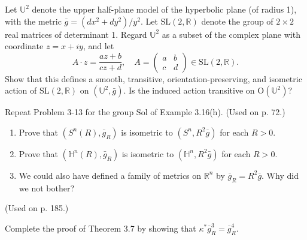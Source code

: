\begin{exercise}\label{prob:sl2r-upper-half-plane}
Let $\mathbb{U}^2$ denote the upper half-plane model of the hyperbolic plane (of radius 1), with the metric $\bar{g} = (dx^2 + dy^2)/y^2$. Let $\text{SL}(2,\mathbb{R})$ denote the group of $2 \times 2$ real matrices of determinant 1. Regard $\mathbb{U}^2$ as a subset of the complex plane with coordinate $z = x + iy$, and let
\[
A \cdot z = \frac{az + b}{cz + d}, \quad A = \begin{pmatrix} a & b \\ c & d \end{pmatrix} \in \text{SL}(2,\mathbb{R}).
\]
Show that this defines a smooth, transitive, orientation-preserving, and isometric action of $\text{SL}(2,\mathbb{R})$ on $(\mathbb{U}^2,\bar{g})$. Is the induced action transitive on $\text{O}(\mathbb{U}^2)$?
\end{exercise}

\begin{exercise}
\label{prob:sol-group-metrics}
Repeat Problem 3-13 for the group Sol of Example 3.16(h). (Used on p. 72.)
\end{exercise}

\begin{exercise}\label{prob:sphere-hyperbolic-scaling}
\begin{enumerate}
\item[(a)] Prove that $(S^n(R),\bar{g}_R)$ is isometric to $(S^n,R^2\bar{g})$ for each $R > 0$.
\item[(b)] Prove that $(\mathbb{H}^n(R),\bar{g}_R)$ is isometric to $(\mathbb{H}^n,R^2\bar{g})$ for each $R > 0$.
\item[(c)] We could also have defined a family of metrics on $\mathbb{R}^n$ by $\bar{g}_R = R^2\bar{g}$. Why did we not bother?
\end{enumerate}
(Used on p. 185.)
\end{exercise}

\begin{exercise}\label{prob:theorem-3-7-proof}
Complete the proof of Theorem 3.7 by showing that $\kappa^* \bar{g}^3_R = \bar{g}^4_R$.
\end{exercise}

